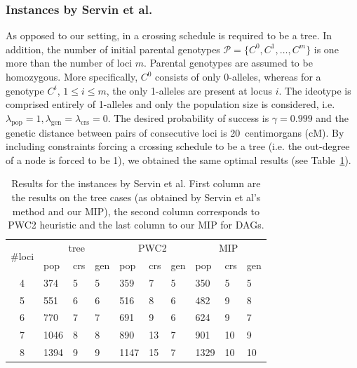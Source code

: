 \documentclass[runningheads]{llncs}
\begin{document}
\subsubsection{Instances by Servin et al.}

As opposed to our setting, in \cite{Servin:2004} a crossing schedule is required to be a tree. In addition,
 the number of initial parental genotypes $\mathcal{P} = \{ C^0, C^1,\ldots, C^m \}$ is one more than the number of loci $m$. Parental genotypes are assumed to be homozygous. More specifically, $C^0$ consists of only 0-alleles, whereas for a genotype $C^i$, $1 \leq i \leq m$, the only 1-alleles are present at locus $i$. The ideotype is comprised entirely of 1-alleles and only the population size is considered, i.e.\ $\lambda_\mathrm{pop} = 1, \lambda_\mathrm{gen} = \lambda_\mathrm{crs} = 0$. 
The desired probability of success is $\gamma=0.999$ and the genetic distance between pairs of consecutive loci is 20~centimorgans (cM). By including constraints forcing a crossing schedule to be a tree (i.e. the out-degree of a node is forced to be 1), we obtained the same optimal results (see Table~\ref{tbl:servin}).

\begin{table}
  \center
    \small\begin{tabular}{|c||lll|lll|lll|}
    \hline
    \multirow{2}{*}{\#loci} & \multicolumn{3}{c|}{tree} & \multicolumn{3}{c|}{PWC2} & \multicolumn{3}{c|}{MIP}\\
           & pop & crs & gen & pop & crs & gen & pop & crs & gen\\
    \hline
    4 & 374  & 5 & 5 & 359  & 7 & 5 & 350  & 5 & 5\\
    5 & 551  & 6 & 6 & 516  & 8 & 6 & 482  & 9 & 8\\
    6 & 770  & 7 & 7 & 691  & 9 & 6 & 624  & 9 & 7\\
    7 & 1046 & 8 & 8 & 890  &13 & 7 & 901  &10 & 9\\
    8 & 1394 & 9 & 9 & 1147 &15 & 7 & 1329 &10 &10\\
    \hline
    \end{tabular}
  \caption{Results for the instances by Servin et al. First column are the results on the tree cases (as obtained by Servin et al's method and our MIP), the second column corresponds to PWC2 heuristic and the last column to our MIP for DAGs.}
  \label{tbl:servin}
\end{table}
\end{document}

